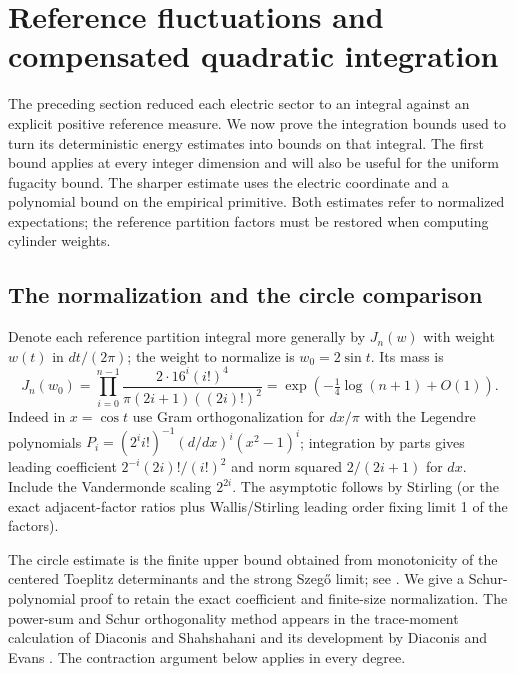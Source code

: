 \section{Reference fluctuations and compensated quadratic integration}\label{sec:E-reference}

The preceding section reduced each electric sector to an integral against
an explicit positive reference measure. We now prove the integration
bounds used to turn its deterministic energy estimates into bounds on
that integral. The first bound applies at every integer dimension and
will also be useful for the uniform fugacity bound. The sharper estimate
uses the electric coordinate and a polynomial bound on the empirical
primitive. Both estimates refer to normalized expectations; the reference
partition factors must be restored when computing cylinder weights.

\subsection{The normalization and the circle comparison}

Denote each reference partition integral more generally by \(J_n(w)\) with weight \(w(t)\) in \(dt/(2\pi)\); the weight to normalize is \(w_0=2\sin t\). Its mass is
\[
 J_n(w_0)=\prod_{i=0}^{n-1}\frac{2\cdot16^i(i!)^4}{\pi(2i+1)((2i)!)^2}
 =\exp\left(-\tfrac14\log(n+1)+O(1)\right).
\]
Indeed in \(x=\cos t\) use Gram orthogonalization for \(dx/\pi\) with the Legendre polynomials \(P_i=(2^i i!)^{-1}(d/dx)^i(x^2-1)^i\); integration by parts gives leading coefficient \(2^{-i}(2i)!/(i!)^2\) and norm squared \(2/(2i+1)\) for \(dx\). Include the Vandermonde scaling \(2^{2i}\). The asymptotic follows by Stirling (or the exact adjacent-factor ratios plus Wallis/Stirling leading order fixing limit 1 of the factors).

The circle estimate is the finite upper bound obtained from monotonicity of the centered Toeplitz determinants and the strong Szeg\H{o} limit; see \cite[Theorems 1.1 and 2.4]{Simon2005Szego}. We give a Schur-polynomial proof to retain the exact coefficient and finite-size normalization. The power-sum and Schur orthogonality method appears in the trace-moment calculation of Diaconis and Shahshahani \cite{DiaconisShahshahani1994} and its development by Diaconis and Evans \cite[Section 2]{DiaconisEvans2001}. The contraction argument below applies in every degree.

